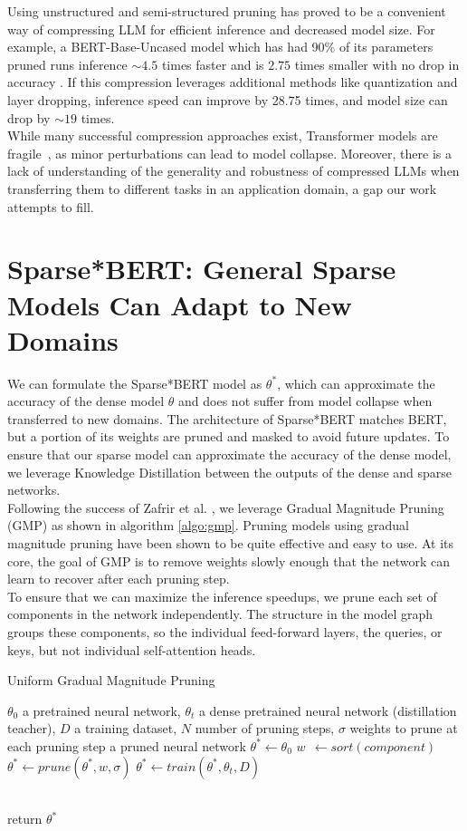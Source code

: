 \documentclass[10pt]{article}
\begin{document}
Using unstructured and semi-structured pruning has proved to be a convenient way of compressing LLM for efficient inference and decreased model size. For example, a BERT-Base-Uncased model which has had 90\% of its parameters pruned runs inference $\sim\!4.5$ times faster and is $2.75$ times smaller with no drop in accuracy \cite{Kurti2022TheOB}. If this compression leverages additional methods like quantization and layer dropping, inference speed can improve by 28.75 times, and model size can drop by $\sim\!19$ times. \\
While many successful compression approaches exist, Transformer models are fragile~\cite{DBLP:journals/corr/abs-2105-06990}, as minor perturbations can lead to model collapse. Moreover, there is a lack of understanding of the generality and robustness of compressed LLMs when transferring them to different tasks in an application domain, a gap our work attempts to fill. 
\section{Sparse*BERT: General Sparse Models Can Adapt to New Domains}
We can formulate the Sparse*BERT model as $\theta^*$, which can approximate the accuracy of the dense model $\theta$ and does not suffer from model collapse when transferred to new domains. The architecture of Sparse*BERT matches BERT, but a portion of its weights are pruned and masked to avoid future updates. To ensure that our sparse model can approximate the accuracy of the dense model, we leverage Knowledge Distillation between the outputs of the dense and sparse networks.   \\
Following the success of Zafrir et al. \cite{Zafrir2021PruneOF}, we leverage Gradual Magnitude Pruning (GMP) as shown in algorithm \ref{algo:gmp}. Pruning models using gradual magnitude pruning have been shown to be quite effective and easy to use. At its core, the goal of GMP is to remove weights slowly enough that the network can learn to recover after each pruning step.  \\
To ensure that we can maximize the inference speedups, we prune each set of components in the network independently. The structure in the model graph groups these components, so the individual feed-forward layers, the queries, or keys, but not individual self-attention heads.
\begin{algorithm}
\caption{Uniform Gradual Magnitude Pruning}
\label{algo:gmp}
\begin{algorithmic}
{\small
\Require $\theta_0$ a pretrained neural network, $\theta_t$ a dense pretrained neural network (distillation teacher), $D$ a training dataset, $N$ number of pruning steps, $\sigma$ weights to prune at each pruning step
\Ensure a pruned neural network
    \State $ \theta^*  \gets \theta_0$
        \State $w\phantom{,} \gets sort(component)$
        \State $\theta^* \gets prune(\theta^*, w, \sigma)$ 
    \EndFor
    \State $\theta^* \gets train(\theta^*,\theta_t,D)$
    
\EndFor \\
return $\theta^*$
}
\end{algorithmic}
\end{algorithm}
\end{document}
